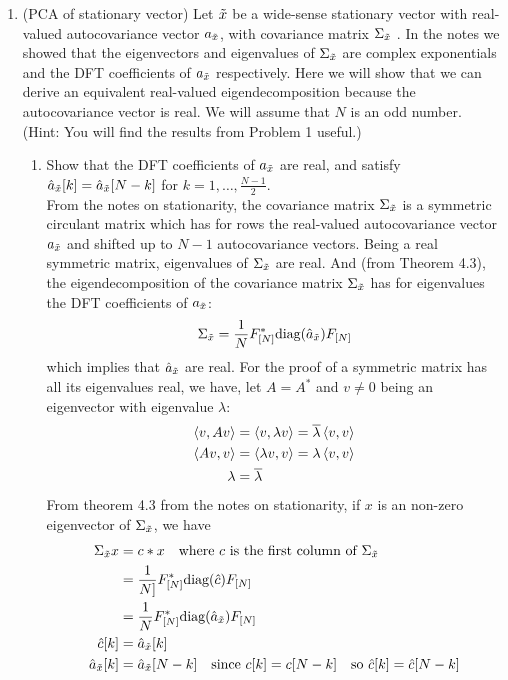 \documentclass[12pt,twoside]{article}
\begin{document}
\begin{enumerate}
 \newpage
 \item (PCA of stationary vector) Let $\tilde{  x }$ be a wide-sense stationary vector with real-valued autocovariance vector $a_{\tilde{  x }}$,  with covariance matrix $\Sigma_{\tilde{  x }}$ . In the notes we showed that the eigenvectors and eigenvalues of $\Sigma_{\tilde{  x }}$ are complex exponentials and the DFT coefficients of $a_{\tilde{  x }}$ respectively. Here we will show that we can derive an equivalent real-valued eigendecomposition because the autocovariance vector is real. We will assume that $N$ is an odd number. (Hint: You will find the results from Problem 1 useful.)
 \begin{enumerate}
 \item Show that the DFT coefficients of $a_{\tilde{  x }}$ are real, and satisfy $\hat{a}_{\tilde{  x }}[k] = \hat{a}_{\tilde{  x }}[N-k]$ for $k=1,\ldots,\frac{N-1}{2}$.\\
 From the notes on stationarity, the covariance matrix $\Sigma_{\tilde{  x }}$ is a symmetric circulant matrix which has for rows the real-valued autocovariance vector $a_{\tilde{  x }}$ and shifted up to $N-1$ autocovariance vectors.
 Being a real symmetric matrix, eigenvalues of $\Sigma_{\tilde{  x }}$  are real. And (from Theorem 4.3), the eigendecomposition of the  covariance matrix $\Sigma_{\tilde{  x }}$ has for eigenvalues the DFT coefficients  of $a_{\tilde{  x }}$:
 $$\Sigma_{\tilde{  x }} = \frac{1}{N} F_{[N]}^* \text{diag}(\hat{a}_{\tilde{  x }}) F_{[N]}$$ which implies that  $\hat{a}_{\tilde{  x }}$ are real.
 For the proof of a symmetric matrix has all its eigenvalues real, we have, let $A=A^*$ and $v\neq 0$ being an eigenvector with eigenvalue $\lambda$:
 \begin{align*}
 	\left \langle v, Av\right \rangle	&= \left \langle v, \lambda v\right \rangle  = \overline{\lambda} \left \langle v, v\right \rangle  \\
 	\left \langle Av, v\right \rangle	&= \left \langle \lambda v, v\right \rangle  = \lambda \left \langle v, v\right \rangle  \\
	\lambda		&=  \overline{\lambda}
 \end{align*}
 From theorem 4.3 from the notes on stationarity, if $x$ is an non-zero eigenvector of $\Sigma_{\tilde{  x }}$, we have
  \begin{align*}
	\Sigma_{\tilde{  x }}x	&= c*x \text{ ~ where } c \text{ is the first column of } \Sigma_{\tilde{  x }}\\
					&= \frac{1}{N]} F_{[N]}^* \text{diag}(\hat{c}) F_{[N]} \\
					&= \frac{1}{N} F_{[N]}^* \text{diag}(\hat{a}_{\tilde{  x }}) F_{[N]} \\
			\hat{c}[k]  &= \hat{a}_{\tilde{  x }}[k] \\
			\hat{a}_{\tilde{  x }}[k]  &=  \hat{a}_{\tilde{  x }}[N-k] \text{ ~ since } c[k] = c[N-k] \text{ ~ so } \hat{c}[k] = \hat{c}[N-k]  \\
 \end{align*} 
 

\end{enumerate}
\end{enumerate}
\end{document}
